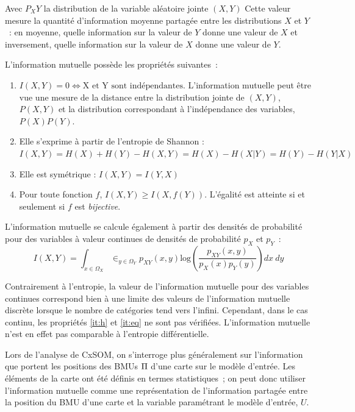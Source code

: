 \documentclass[../main]{subfiles}
\begin{document}
Avec $P_XY$ la distribution de la variable aléatoire jointe $(X,Y)$
Cette valeur mesure la quantité d'information moyenne partagée entre les distributions $X$ et $Y$~: en moyenne, quelle information sur la valeur de $Y$ donne une valeur de $X$ et inversement, quelle information sur la valeur de $X$ donne une valeur de $Y$.

L'information mutuelle possède les propriétés suivantes~:
\begin{enumerate}
\item $I(X,Y) = 0 \Leftrightarrow \textrm{X et Y sont indépendantes}$. L'information mutuelle peut être vue une mesure de la distance entre la distribution jointe de $(X,Y)$, $P(X,Y)$ et la distribution correspondant à l'indépendance des variables, $P(X)P(Y)$.
\item\label{it:h} Elle s'exprime à partir de l'entropie de Shannon : $I(X,Y) = H(X) + H(Y) - H(X,Y) = H(X) - H(X|Y) = H(Y) - H(Y|X)$
\item Elle est symétrique : $I(X,Y) = I(Y,X)$
\item\label{it:eq} Pour toute fonction $f$, $I(X,Y) \geq I(X,f(Y))$. L'égalité est atteinte si et seulement si $f$ est \emph{bijective}.
\end{enumerate}

L'information mutuelle se calcule également à partir des densités de probabilité pour des variables à valeur continues de densités de probabilité $p_X$ et $p_Y$~:
\begin{equation}
    I(X,Y) = \int_{x \in \Omega_X}\in _ {y \in \Omega_Y }{p_{XY}(x,y)\textrm{log}(\frac{p_{XY}(x,y)}{p_X(x)p_Y(y)})dx \: dy}
\end{equation}

Contrairement à l'entropie, la valeur de l'information mutuelle pour des variables continues correspond bien à une limite des valeurs de l'information mutuelle discrète lorsque le nombre de catégories tend vers l'infini.
Cependant, dans le cas continu, les propriétés \ref{it:h} et \ref{it:eq} ne sont pas vérifiées. L'information mutuelle n'est en effet pas comparable à l'entropie différentielle.

Lors de l'analyse de CxSOM, on s'interroge plus généralement sur l'information que portent les positions des BMUs $\Pi$ d'une carte sur le modèle d'entrée.
Les éléments de la carte ont été définis en termes statistiques~; on peut donc utiliser l'information mutuelle comme une représentation de l'information partagée entre la position du BMU d'une carte et la variable paramétrant le modèle d'entrée, $U$.
\end{document}
